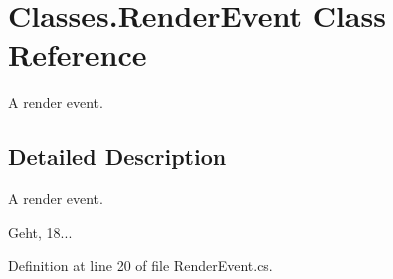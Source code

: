 \section{Classes.\-Render\-Event Class Reference}
\label{class_classes_1_1_render_event}


A render event.  




\subsection{Detailed Description}
A render event. 

Geht, 18... 

Definition at line 20 of file Render\-Event.\-cs.

